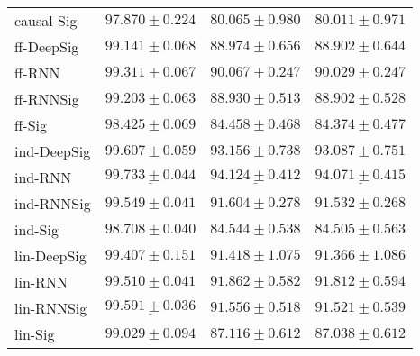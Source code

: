 \begin{tabular}{llll}
causal-Sig     &                           $ 97.870 \pm 0.224 $ &                           $ 80.065 \pm 0.980 $ &                           $ 80.011 \pm 0.971 $ \\
ff-DeepSig     &                           $ 99.141 \pm 0.068 $ &                           $ 88.974 \pm 0.656 $ &                           $ 88.902 \pm 0.644 $ \\
ff-RNN         &                           $ 99.311 \pm 0.067 $ &                           $ 90.067 \pm 0.247 $ &                           $ 90.029 \pm 0.247 $ \\
ff-RNNSig      &                           $ 99.203 \pm 0.063 $ &                           $ 88.930 \pm 0.513 $ &                           $ 88.902 \pm 0.528 $ \\
ff-Sig         &                           $ 98.425 \pm 0.069 $ &                           $ 84.458 \pm 0.468 $ &                           $ 84.374 \pm 0.477 $ \\
ind-DeepSig    &               $  \mathbf{ 99.607 \pm 0.059 } $ &               $  \mathbf{ 93.156 \pm 0.738 } $ &               $  \mathbf{ 93.087 \pm 0.751 } $ \\
ind-RNN        &  $  \mathbf{ \underline{ 99.733 \pm 0.044 }} $ &  $  \mathbf{ \underline{ 94.124 \pm 0.412 }} $ &  $  \mathbf{ \underline{ 94.071 \pm 0.415 }} $ \\
ind-RNNSig     &                           $ 99.549 \pm 0.041 $ &                           $ 91.604 \pm 0.278 $ &                           $ 91.532 \pm 0.268 $ \\
ind-Sig        &                           $ 98.708 \pm 0.040 $ &                           $ 84.544 \pm 0.538 $ &                           $ 84.505 \pm 0.563 $ \\
lin-DeepSig    &                           $ 99.407 \pm 0.151 $ &                           $ 91.418 \pm 1.075 $ &                           $ 91.366 \pm 1.086 $ \\
lin-RNN        &                           $ 99.510 \pm 0.041 $ &                           $ 91.862 \pm 0.582 $ &                           $ 91.812 \pm 0.594 $ \\
lin-RNNSig     &            $  \underline{ 99.591 \pm 0.036 } $ &                           $ 91.556 \pm 0.518 $ &                           $ 91.521 \pm 0.539 $ \\
lin-Sig        &                           $ 99.029 \pm 0.094 $ &                           $ 87.116 \pm 0.612 $ &                           $ 87.038 \pm 0.612 $ \\

\end{tabular}
